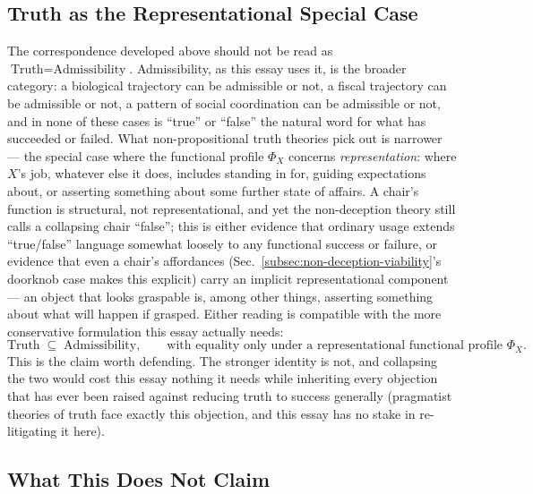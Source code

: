 \documentclass[12pt,a4paper]{article}
\theoremstyle{plain}
\theoremstyle{definition}
\theoremstyle{remark}
\begin{document}
\subsection{Truth as the Representational Special Case}
\label{subsec:truth-as-special-case}

The correspondence developed above should not be read as $\text{Truth} = \text{Admissibility}$. Admissibility, as this essay uses it, is the broader category: a biological trajectory can be admissible or not, a fiscal trajectory can be admissible or not, a pattern of social coordination can be admissible or not, and in none of these cases is ``true'' or ``false'' the natural word for what has succeeded or failed. What non-propositional truth theories pick out is narrower — the special case where the functional profile $\Phi_X$ concerns \emph{representation}: where $X$'s job, whatever else it does, includes standing in for, guiding expectations about, or asserting something about some further state of affairs. A chair's function is structural, not representational, and yet the non-deception theory still calls a collapsing chair ``false''; this is either evidence that ordinary usage extends ``true/false'' language somewhat loosely to any functional success or failure, or evidence that even a chair's affordances (Sec.~\ref{subsec:non-deception-viability}'s doorknob case makes this explicit) carry an implicit representational component — an object that looks graspable is, among other things, asserting something about what will happen if grasped. Either reading is compatible with the more conservative formulation this essay actually needs:
\[
\text{Truth} \;\subseteq\; \text{Admissibility}, \qquad \text{with equality only under a representational functional profile } \Phi_X.
\]
This is the claim worth defending. The stronger identity is not, and collapsing the two would cost this essay nothing it needs while inheriting every objection that has ever been raised against reducing truth to success generally (pragmatist theories of truth face exactly this objection, and this essay has no stake in re-litigating it here).

\subsection{What This Does Not Claim}
\label{subsec:truth-caveat}
\end{document}
